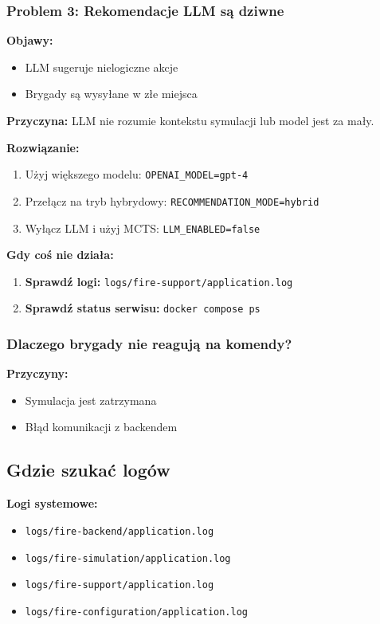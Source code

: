 \documentclass[11pt,a4paper]{article}
\begin{document}
\subsubsection{Problem 3: Rekomendacje LLM są dziwne}

\textbf{Objawy:}
\begin{itemize}
    \item LLM sugeruje nielogiczne akcje
    \item Brygady są wysyłane w złe miejsca
\end{itemize}

\textbf{Przyczyna:} LLM nie rozumie kontekstu symulacji lub model jest za mały.

\textbf{Rozwiązanie:}
\begin{enumerate}
    \item Użyj większego modelu: \texttt{OPENAI\_MODEL=gpt-4}
    \item Przełącz na tryb hybrydowy: \texttt{RECOMMENDATION\_MODE=hybrid}
    \item Wyłącz LLM i użyj MCTS: \texttt{LLM\_ENABLED=false}
\end{enumerate}

\textbf{Gdy coś nie działa:}

\begin{enumerate}
    \item \textbf{Sprawdź logi:} \texttt{logs/fire-support/application.log}
    \item \textbf{Sprawdź status serwisu:} \texttt{docker compose ps}
\end{enumerate}

\subsubsection{Dlaczego brygady nie reagują na komendy?}

\textbf{Przyczyny:}
\begin{itemize}
    \item Symulacja jest zatrzymana
    \item Błąd komunikacji z backendem
\end{itemize}

\subsection{Gdzie szukać logów}

\textbf{Logi systemowe:}
\begin{itemize}
    \item \texttt{logs/fire-backend/application.log}
    \item \texttt{logs/fire-simulation/application.log}
    \item \texttt{logs/fire-support/application.log}
    \item \texttt{logs/fire-configuration/application.log}
\end{itemize}
\end{document}
